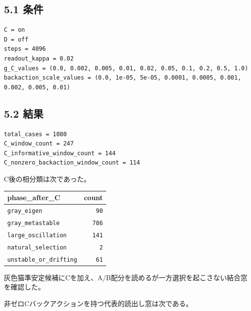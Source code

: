 \documentclass{article}
\newcounter{none}
\begin{document}
\subsection{5.1 条件}\label{ux6761ux4ef6-1}

\begin{verbatim}
C = on
D = off
steps = 4096
readout_kappa = 0.02
g_C_values = (0.0, 0.002, 0.005, 0.01, 0.02, 0.05, 0.1, 0.2, 0.5, 1.0)
backaction_scale_values = (0.0, 1e-05, 5e-05, 0.0001, 0.0005, 0.001, 0.002, 0.005, 0.01)
\end{verbatim}

\subsection{5.2 結果}\label{ux7d50ux679c-1}

\begin{verbatim}
total_cases = 1080
C_window_count = 247
C_informative_window_count = 144
C_nonzero_backaction_window_count = 114
\end{verbatim}

C後の相分類は次であった。

{\def\LTcaptype{none} %
\begin{longtable}[]{@{}lr@{}}
\toprule\noalign{}
phase\_after\_C & count \\
\midrule\noalign{}
\endhead
\bottomrule\noalign{}
\endlastfoot
\texttt{gray\_eigen} & \texttt{90} \\
\texttt{gray\_metastable} & \texttt{786} \\
\texttt{large\_oscillation} & \texttt{141} \\
\texttt{natural\_selection} & \texttt{2} \\
\texttt{unstable\_or\_drifting} & \texttt{61} \\
\end{longtable}
}

灰色猫準安定候補にCを加え、A/B配分を読めるが一方選択を起こさない結合窓を確認した。

非ゼロCバックアクションを持つ代表的読出し窓は次である。
\end{document}
